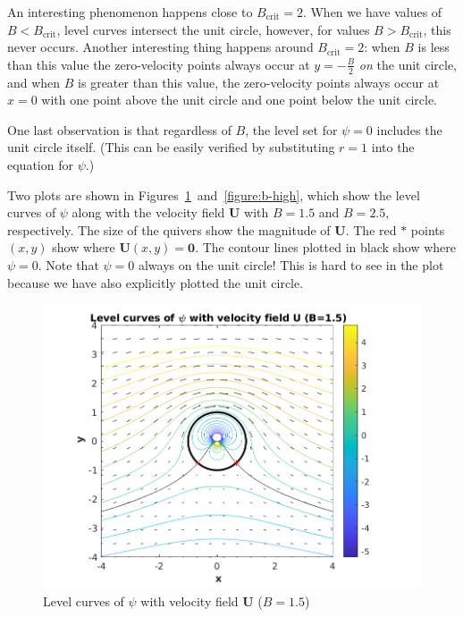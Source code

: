 \documentclass{article}
\def\*#1{\mathbf{#1}}
\begin{document}
An interesting phenomenon happens close to $B_{\text{crit}} = 2$. When
we have values of $B < B_{\text{crit}}$, level curves intersect the unit
circle, however, for values $B > B_{\text{crit}}$, this never occurs.
Another interesting thing happens around $B_{\text{crit}} = 2$: when $B$
is less than this value the zero-velocity points always occur at $y =
- \frac{B}{2}$ \textit{on} the unit circle, and when $B$ is greater than
this value, the zero-velocity points always occur at $x = 0$
with one point above the unit circle and one point below the unit circle.

One last observation is that regardless of $B$, the level set for $\psi
= 0$ includes the unit circle itself. (This can be easily verified by
substituting $r = 1$ into the equation for $\psi$.)

Two plots are shown in
Figures~\ref{figure:b-low}~and~\ref{figure:b-high}, which show the level
curves of $\psi$ along with the velocity field $\*U$ with $B = 1.5$ and
$B = 2.5$, respectively. The size of the quivers show the magnitude of
$\*U$. The red $\ast$ points $(x, y)$ show where $\*U(x, y) = \*0$. The
contour lines plotted in black show where $\psi = 0$. Note that $\psi = 0$
always on the unit circle! This is hard to see in the plot because we
have also explicitly plotted the unit circle.
%
\begin{figure}
    \includegraphics[width=\textwidth]{fig1}
    \centering
    \caption{Level curves of $\psi$ with velocity field $\*U$ ($B = 1.5$)}
    \label{figure:b-low}
\end{figure}
%
\end{document}
